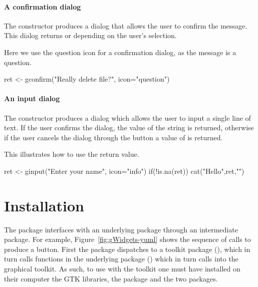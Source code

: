 \paragraph{A confirmation dialog}
The constructor  produces a dialog that allows
the user to confirm the message. This dialog returns  or
 depending on the user's selection.


Here we use the question icon for a confirmation dialog, as the message is a question.
\begin{Schunk}
\begin{Sinput}
 ret <- gconfirm("Really delete file?", icon="question")
\end{Sinput}
\end{Schunk}


\paragraph{An input dialog}
The  constructor produces a dialog which allows
the user to input a single line of text. If the user confirms the
dialog, the value of the string is returned, otherwise if the user
cancels the dialog through the button a value of  is returned.


This illustrates how to use the return value.
\begin{Schunk}
\begin{Sinput}
 ret <- ginput("Enter your name", icon="info")
 if(!is.na(ret)) 
   cat("Hello",ret,"\n")
\end{Sinput}
\end{Schunk}







\section{Installation}
\label{sec:installation}



The  package interfaces with an underlying \R\/ package
through an intermediate package. For example,
Figure~\ref{fig:gWidgets-yuml} shows the sequence of calls to produce
a button. First the  package dispatches to a toolkit
package (), which in turn calls functions in the
underlying \R\/ package () which in turn calls into the
graphical toolkit. As such, to use  with the \GTK\/
toolkit one must have installed on their computer the GTK\/ libraries,
the  package and the two  packages.


